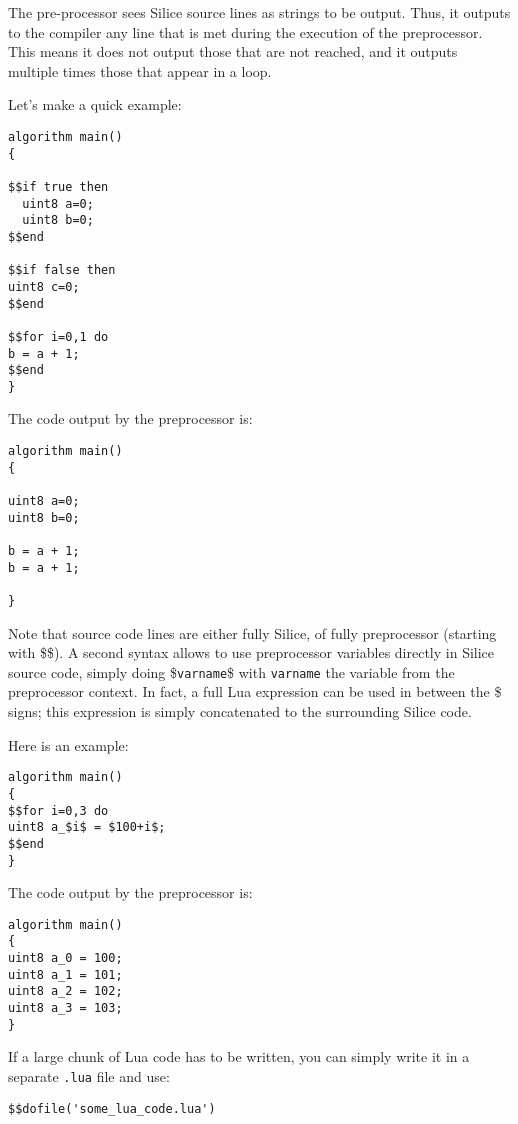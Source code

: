 \documentclass[a4]{article}
\newcommand\silice{Silice}
\begin{document}
The pre-processor sees Silice source lines as strings to be output. 
Thus, it outputs to the compiler any line that is met during the execution
of the preprocessor. This means it does not output those that are not reached, and
it outputs multiple times those that appear in a loop.

Let's make a quick example:

\begin{verbatim}
algorithm main()
{

$$if true then
  uint8 a=0;
  uint8 b=0;
$$end

$$if false then
uint8 c=0;
$$end

$$for i=0,1 do
b = a + 1;
$$end
}
\end{verbatim}

The code output by the preprocessor is:

\begin{verbatim}
algorithm main()
{

uint8 a=0;
uint8 b=0;

b = a + 1;
b = a + 1;

}
\end{verbatim}

Note that source code lines are either fully \silice{}, of fully preprocessor (starting with \$\$). A second syntax allows to use preprocessor variables directly in \silice{} source code, simply doing \$\texttt{varname}\$ with \texttt{varname} the variable from the preprocessor context. In fact, a full Lua expression can be used in between the \$ signs; this expression is simply concatenated to the surrounding \silice{} code.

Here is an example:

\begin{verbatim}
algorithm main()
{
$$for i=0,3 do
uint8 a_$i$ = $100+i$;
$$end
}
\end{verbatim}

The code output by the preprocessor is:

\begin{verbatim}
algorithm main()
{
uint8 a_0 = 100;
uint8 a_1 = 101;
uint8 a_2 = 102;
uint8 a_3 = 103;
}
\end{verbatim}

If a large chunk of Lua code has to be written, you can simply write it in a separate \texttt{.lua} file and use:
\begin{verbatim}
$$dofile('some_lua_code.lua')
\end{verbatim}
\end{document}
